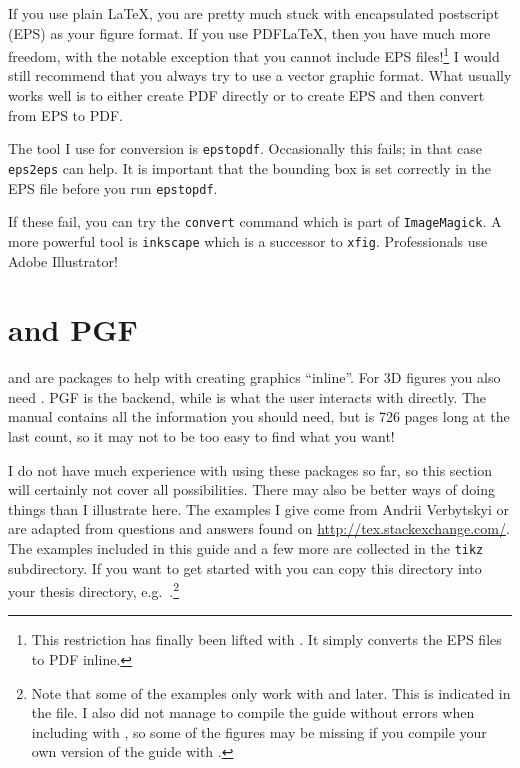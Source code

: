 If you use plain \LaTeX, you are pretty much stuck with encapsulated
postscript (EPS) as your figure format. If you use PDF\LaTeX, then you
have much more freedom, with the notable exception that you cannot
include EPS files!\footnote{%
This restriction has finally been lifted with . It
simply converts the EPS files to PDF inline.}
I would still recommend that you always try to use
a vector graphic format. What usually works well is to either create
PDF directly or to create EPS and then convert from EPS to PDF.

The tool I use for conversion is \texttt{epstopdf}. Occasionally this
fails; in that case \texttt{eps2eps} can help. It is important that
the bounding box is set correctly in the EPS file before you run
\texttt{epstopdf}.

If these fail, you can try the \texttt{convert} command which is part
of \texttt{ImageMagick}. A more powerful tool is \texttt{inkscape}
which is a successor to \texttt{xfig}. Professionals use Adobe Illustrator!


\section{\TikZ and PGF}
\label{sec:fig:tikz}

 and  are packages to help with
creating graphics \enquote{inline}. For 3D figures you also need
. PGF is the backend, while \TikZ is what the
user interacts with directly. The manual contains all the information
you should need, but is 726 pages long at the last count, so it may
not to be too easy to find what you want!

I do not have much experience with using these packages so far, so
this section will certainly not cover all possibilities. There may
also be better ways of doing things than I illustrate here. The
examples I give come from Andrii Verbytskyi or are adapted from
questions and answers found on
\url{http://tex.stackexchange.com/}. The examples included in this
guide and a few more are collected in the \texttt{tikz}
subdirectory.
If you want to get started with \TikZ you can copy this directory
into your thesis directory, e.g.\ .\footnote{%
Note that some of the examples only work with  and later. This is indicated in the file. I also did not manage
to compile the guide without errors when including  with
, so some of the figures may be missing if you compile
your own version of the guide with .}

